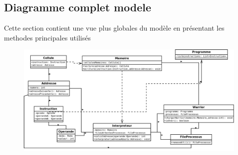 \documentclass[12pt]{article}
\begin{document}
\subsection*{Diagramme complet modele}
Cette section contient une vue plus globales du modèle en présentant les methodes principales
utilisés

\begin{figure}[h!]
	\includegraphics[scale=0.4]{Images/diagrammeModeleComplet.png}
\end{figure}
\end{document}
